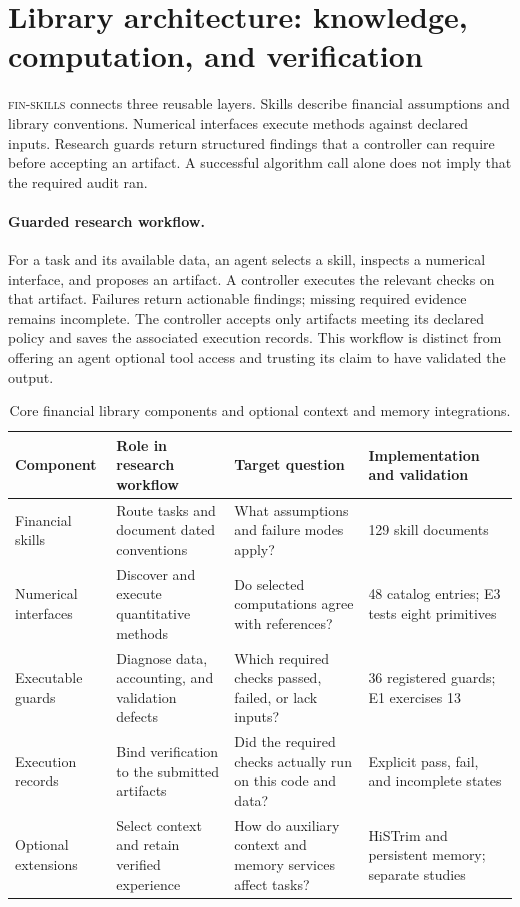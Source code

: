 \section{Library architecture: knowledge, computation, and verification}
\label{sec:framework}
\textsc{fin-skills} connects three reusable layers. Skills describe financial assumptions
and library conventions. Numerical interfaces execute methods against declared inputs.
Research guards return structured findings that a controller can require before accepting
an artifact. A successful algorithm call alone does not imply that the required audit ran.

\paragraph{Guarded research workflow.}
For a task and its available data, an agent selects a skill, inspects a numerical
interface, and proposes an artifact. A controller executes the relevant checks on that
artifact. Failures return actionable findings; missing required evidence remains
incomplete. The controller accepts only artifacts meeting its declared policy and saves
the associated execution records. This workflow is distinct from offering an agent
optional tool access and trusting its claim to have validated the output.

\begin{table}[t]
\centering\small
\setlength{\tabcolsep}{5pt}
\begin{tabular}{p{}p{}p{}p{}}
\toprule
Component & Role in research workflow & Target question & Implementation and validation \\
\midrule
Financial skills & Route tasks and document dated conventions &
What assumptions and failure modes apply? & 129 skill documents \\
Numerical interfaces & Discover and execute quantitative methods &
Do selected computations agree with references? & 48 catalog entries; E3 tests eight primitives \\
Executable guards & Diagnose data, accounting, and validation defects &
Which required checks passed, failed, or lack inputs? & 36 registered guards; E1 exercises 13 \\
Execution records & Bind verification to the submitted artifacts &
Did the required checks actually run on this code and data? & Explicit pass, fail, and incomplete states \\
Optional extensions & Select context and retain verified experience &
How do auxiliary context and memory services affect tasks? & HiSTrim and persistent memory; separate studies \\
\bottomrule
\end{tabular}
\caption{Core financial library components and optional context and memory integrations.}
\label{tab:framework}
\end{table}

